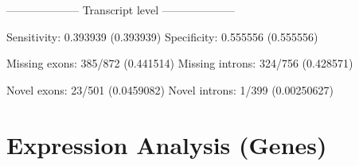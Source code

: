\documentclass[]{article}
\newenvironment{Shaded}{\begin{snugshade}}{\end{snugshade}}
\newcommand{\DecValTok}[1]{\textcolor[rgb]{0.00,0.00,0.81}{{#1}}}
\newcommand{\FloatTok}[1]{\textcolor[rgb]{0.00,0.00,0.81}{{#1}}}
\newcommand{\StringTok}[1]{\textcolor[rgb]{0.31,0.60,0.02}{{#1}}}
\newcommand{\NormalTok}[1]{{#1}}
\begin{document}
\begin{Shaded}
\begin{Highlighting}[]
   \NormalTok{--------------------}\StringTok{ }\NormalTok{Transcript level --------------------}

\StringTok{   }\NormalTok{Sensitivity:}\StringTok{ }\FloatTok{0.393939} \NormalTok{(}\FloatTok{0.393939}\NormalTok{)}
   \NormalTok{Specificity:}\StringTok{ }\FloatTok{0.555556} \NormalTok{(}\FloatTok{0.555556}\NormalTok{)}

   \NormalTok{Missing exons:}\StringTok{ }\DecValTok{385}\NormalTok{/}\DecValTok{872} \NormalTok{(}\FloatTok{0.441514}\NormalTok{)}
   \NormalTok{Missing introns:}\StringTok{ }\DecValTok{324}\NormalTok{/}\DecValTok{756} \NormalTok{(}\FloatTok{0.428571}\NormalTok{)}

   \NormalTok{Novel exons:}\StringTok{ }\DecValTok{23}\NormalTok{/}\DecValTok{501} \NormalTok{(}\FloatTok{0.0459082}\NormalTok{)}
   \NormalTok{Novel introns:}\StringTok{ }\DecValTok{1}\NormalTok{/}\DecValTok{399} \NormalTok{(}\FloatTok{0.00250627}\NormalTok{)}
\end{Highlighting}
\end{Shaded}

\section{Expression Analysis (Genes)}\label{expression-analysis-genes}
\end{document}
